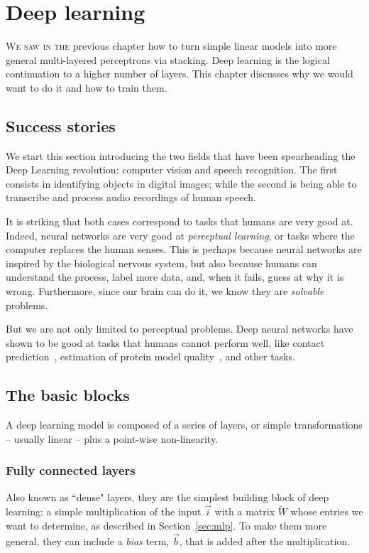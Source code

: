 \chapter{Deep learning}
\lettrine[lines=3, lhang=0.1, nindent=0em, findent=3pt]{\color{Maroon}W}{e saw in the}
previous chapter how to turn simple linear models into more general multi-layered perceptrons via stacking.
Deep learning is the logical continuation to a higher number of layers.
This chapter discusses why we would want to do it and how to train them.

\section*{Success stories}
We start this section introducing the two fields that have been spearheading the Deep Learning revolution: computer vision and speech recognition.
The first consists in identifying objects in digital images; while the second is being able to transcribe and process audio recordings of human speech.

It is striking that both cases correspond to tasks that humans are very good at.
Indeed, neural networks are very good at \emph{perceptual learning}, or tasks where the computer replaces the human senses.
This is perhaps because neural networks are inspired by the biological nervous system, but also because humans can understand the process,
label more data, and, when it fails, guess at why it is wrong.
Furthermore, since our brain can do it, we know they are \emph{solvable} problems.

But we are not only limited to perceptual problems.
Deep neural networks have shown to be good at tasks that humans cannot perform well, like contact prediction~\citep{ultra_deep_contacts}, estimation of protein model quality~\citep{casp13_ema}, and other tasks.


\section{The basic blocks}
A deep learning model is composed of a series of layers, or simple transformations -- usually linear -- plus a point-wise non-linearity.


\subsection{Fully connected layers}
Also known as ``dense" layers, they are the simplest building block of deep learning: a simple multiplication of the input $\vec{i}$ with a matrix $\widetilde{W}$ whose entries we want to determine, as described in Section~\ref{sec:mlp}.
To make them more general, they can include a \emph{bias} term, $\vec b$, that is added after the multiplication.

